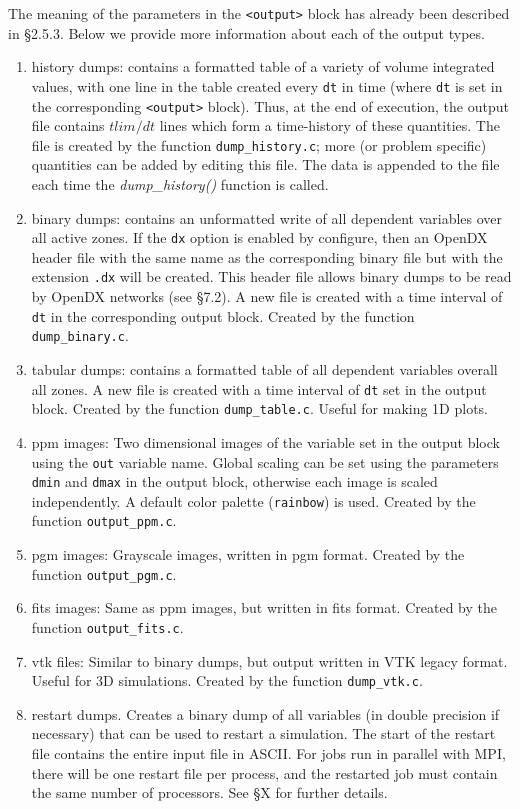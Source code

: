 The meaning of the parameters in the {\tt <output>} block has already been
described in \S 2.5.3.  Below we provide more information about each of the
output types.
\begin{enumerate}
\item history dumps: contains a formatted table of a variety of volume
integrated values, with one line in the table created 
every {\tt dt} in time (where {\tt dt} is set in the corresponding
{\tt <output>}
block).  Thus, at the end of execution, the output file contains $tlim/dt$
lines which form a time-history of these
quantities.  The file is created by the function {\tt dump\_history.c}; more
(or problem specific) quantities can be added by editing this file.
The data is appended to the file each time the {\it dump\_history()}
function is called.
\item binary dumps: contains an unformatted write of all dependent variables
over all active zones.  If the 
{\tt dx} option is enabled by configure, then an OpenDX header file
with the same name as the corresponding binary file but with the extension
{\tt .dx} will
be created.  This header file allows binary dumps to be read by OpenDX
networks (see \S7.2).  A new file is created with a time interval of {\tt dt}
in the corresponding output block.  Created by the function
{\tt dump\_binary.c}. 
\item tabular dumps: contains a formatted table of all dependent variables 
overall all zones.
A new file is created with a time interval of {\tt dt} set in the output
block.  Created by the function {\tt dump\_table.c}.
Useful for making 1D plots.
\item ppm images:  Two dimensional images of the variable set in the output
block using the {\tt out} variable name.  Global scaling can be set using the
parameters {\tt dmin} and {\tt dmax} in the output block, otherwise each image
is scaled independently.  A default color palette ({\tt rainbow}) is used. 
Created by the function {\tt output\_ppm.c}.
\item pgm images: Grayscale images, written in pgm format.
Created by the function {\tt output\_pgm.c}.
\item fits images: Same as ppm images, but written in fits format.
Created by the function {\tt output\_fits.c}.
\item vtk files: Similar to binary dumps, but output written in VTK legacy
format.  Useful for 3D simulations.  
Created by the function {\tt dump\_vtk.c}.
\item restart dumps.  Creates a binary dump of all variables (in double
precision if necessary) that can be used to restart a simulation.  The
start of the restart file contains the entire input file in ASCII.  
For jobs run in parallel with MPI, there will be one restart file per process,
and the restarted job must contain the same number of processors.  See \S X
for further details.
\end{enumerate}

